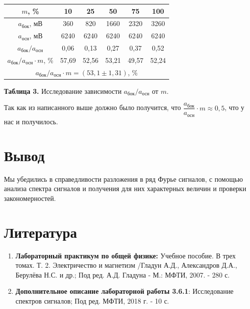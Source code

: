 \documentclass[a4paper, 12pt]{article}%
\begin{document}
\begin{center}
\begin{tabular}{|c|c|c|c|c|c|}
\hline
$m$, \% & 10 & 25 & 50 & 75 & 100 \\ \hline
$a_{\text{бок}}$, мВ & 360 & 820 & 1660 & 2320 & 3260 \\ \hline
$a_{\text{осн}}$, мВ & 6240 & 6240 & 6240 & 6240 & 6240 \\ \hline
$a_{\text{бок}}/a_{\text{осн}}$ & 0,06 & 0,13 & 0,27 & 0,37 & 0,52 \\ \hline
$a_{\text{бок}}/a_{\text{осн}} \cdot m$, \% & 57,69 & 52,56 & 53,21 & 49,57 & 52,24 \\ \hline
\multicolumn{6}{|c|}{$a_{\text{бок}}/a_{\text{осн}} \cdot m = (53,1 \pm 1,31)$, \%} \\ \hline
\end{tabular}

\textbf{Таблица 3.} Исследование зависимости $a_{\text{бок}}/a_{\text{осн}}$ от $m$.
\end{center}
Так как из написанного выше должно было получится, что $\dfrac{a_{\text{бок}}}{a_{\text{осн}}} \cdot m \approx 0,5$, что у нас и получилось.
\newpage
\section*{Вывод}
Мы убедились в справедливости разложения в ряд Фурье сигналов, с помощью анализа спектра сигналов и получения для них характерных величин и проверки закономерностей. 
\section*{Литература}
\begin{enumerate}
\item \textbf{Лабораторный практикум по общей физике:} Учебное пособие. В трех томах. Т. 2. Электричество и магнетизм /Гладун А.Д., Александров Д.А., Берулёва Н.С. и др.; Под ред. А.Д. Гладуна - М.: МФТИ, 2007. - 280 с.
\item \textbf{Дополнительное описание лабораторной работы 3.6.1}: Исследование спектров сигналов; Под ред. МФТИ, 2018 г. - 10 с.
\end{enumerate}
\end{document}
